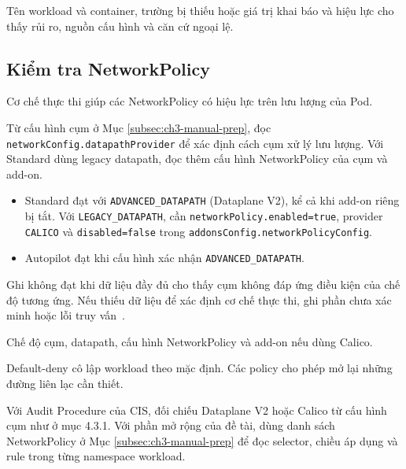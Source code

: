 Tên workload và container, trường bị thiếu hoặc giá trị khai báo và hiệu lực cho thấy rủi ro, nguồn cấu hình và căn cứ ngoại lệ.

\subsection{Kiểm tra NetworkPolicy}

Cơ chế thực thi giúp các NetworkPolicy có hiệu lực trên lưu lượng của Pod.

Từ cấu hình cụm ở Mục \ref{subsec:ch3-manual-prep}, đọc \texttt{networkConfig.\allowbreak datapathProvider} để xác định cách cụm xử lý lưu lượng. Với Standard dùng legacy datapath, đọc thêm cấu hình NetworkPolicy của cụm và add-on.

\begin{itemize}[leftmargin=1.1cm,itemsep=0pt,topsep=3pt]
  \item Standard đạt với \texttt{ADVANCED\_DATAPATH} (Dataplane V2), kể cả khi add-on riêng bị tắt. Với \texttt{LEGACY\_DATAPATH}, cần \texttt{networkPolicy.enabled=true}, provider \texttt{CALICO} và \texttt{disabled=false} trong \texttt{addonsConfig.\allowbreak networkPolicyConfig}.
  \item Autopilot đạt khi cấu hình xác nhận \texttt{ADVANCED\_DATAPATH}.
\end{itemize}
Ghi không đạt khi dữ liệu đầy đủ cho thấy cụm không đáp ứng điều kiện của chế độ tương ứng. Nếu thiếu dữ liệu để xác định cơ chế thực thi, ghi phần chưa xác minh hoặc lỗi truy vấn~\mbox{\parencites[tr.~64--65]{cis-gke-standard-v2}[tr.~46--47]{cis-gke-autopilot-v2}}.

Chế độ cụm, datapath, cấu hình NetworkPolicy và add-on nếu dùng Calico.

Default-deny cô lập workload theo mặc định. Các policy cho phép mở lại những đường liên lạc cần thiết.

Với Audit Procedure của CIS, đối chiếu Dataplane V2 hoặc Calico từ cấu hình cụm như ở mục 4.3.1. Với phần mở rộng của đề tài, dùng danh sách NetworkPolicy ở Mục \ref{subsec:ch3-manual-prep} để đọc selector, chiều áp dụng và rule trong từng namespace workload.

